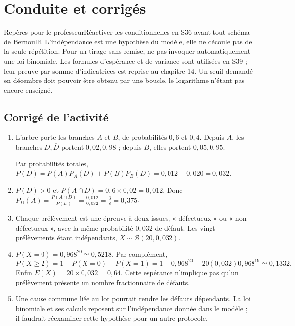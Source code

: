 \ifprof\clearpage\section{Conduite et corrigés}\begin{profbox}{Repères pour le professeur}Réactiver les conditionnelles en S36 avant tout schéma de Bernoulli. L'indépendance est une hypothèse du modèle, elle ne découle pas de la seule répétition. Pour un tirage sans remise, ne pas invoquer automatiquement une loi binomiale. Les formules d'espérance et de variance sont utilisées en S39 ; leur preuve par somme d'indicatrices est reprise au chapitre 14. Un seuil demandé en décembre doit pouvoir être obtenu par une boucle, le logarithme n'étant pas encore enseigné.\end{profbox}

\subsection{Corrigé de l'activité}\begin{enumerate}
\item L'arbre porte les branches $A$ et $B$, de probabilités $0{,}6$ et $0{,}4$. Depuis $A$, les branches $D,\overline D$ portent $0{,}02,0{,}98$ ; depuis $B$, elles portent $0{,}05,0{,}95$.
\begin{center}\end{center}
Par probabilités totales, $P(D)=P(A)P_A(D)+P(B)P_B(D)=0{,}012+0{,}020=0{,}032$.
\item $P(D)>0$ et $P(A\cap D)=0{,}6\times0{,}02=0{,}012$. Donc $P_D(A)=\frac{P(A\cap D)}{P(D)}=\frac{0{,}012}{0{,}032}=\frac{3}{8}=0{,}375$.
\item Chaque prélèvement est une épreuve à deux issues, « défectueux » ou « non défectueux », avec la même probabilité $0{,}032$ de défaut. Les vingt prélèvements étant indépendants, $X\sim\mathcal B(20,0{,}032)$.
\item $P(X=0)=0{,}968^{20}\simeq0{,}5218$. Par complément,
\[P(X\ge2)=1-P(X=0)-P(X=1)=1-0{,}968^{20}-20(0{,}032)0{,}968^{19}\simeq0{,}1332.\]
Enfin $E(X)=20\times0{,}032=0{,}64$. Cette espérance n'implique pas qu'un prélèvement présente un nombre fractionnaire de défauts.
\item Une cause commune liée au lot pourrait rendre les défauts dépendants. La loi binomiale et ses calculs reposent sur l'indépendance donnée dans le modèle ; il faudrait réexaminer cette hypothèse pour un autre protocole.
\end{enumerate}

